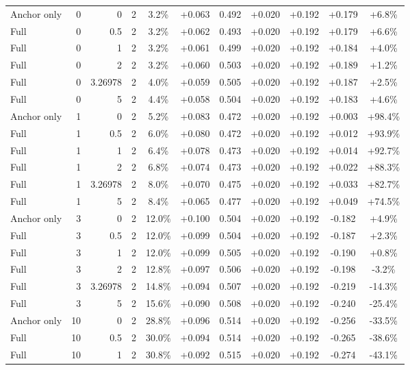 \begin{table}[htbp]
\begin{tabular}{lrrrccccccc}
Anchor only & 0 & 0 & 2 & 3.2\% & +0.063 & 0.492 & +0.020 & +0.192 & +0.179 & +6.8\% \\
Full & 0 & 0.5 & 2 & 3.2\% & +0.062 & 0.493 & +0.020 & +0.192 & +0.179 & +6.6\% \\
Full & 0 & 1 & 2 & 3.2\% & +0.061 & 0.499 & +0.020 & +0.192 & +0.184 & +4.0\% \\
Full & 0 & 2 & 2 & 3.2\% & +0.060 & 0.503 & +0.020 & +0.192 & +0.189 & +1.2\% \\
Full & 0 & 3.26978 & 2 & 4.0\% & +0.059 & 0.505 & +0.020 & +0.192 & +0.187 & +2.5\% \\
Full & 0 & 5 & 2 & 4.4\% & +0.058 & 0.504 & +0.020 & +0.192 & +0.183 & +4.6\% \\
Anchor only & 1 & 0 & 2 & 5.2\% & +0.083 & 0.472 & +0.020 & +0.192 & +0.003 & +98.4\% \\
Full & 1 & 0.5 & 2 & 6.0\% & +0.080 & 0.472 & +0.020 & +0.192 & +0.012 & +93.9\% \\
Full & 1 & 1 & 2 & 6.4\% & +0.078 & 0.473 & +0.020 & +0.192 & +0.014 & +92.7\% \\
Full & 1 & 2 & 2 & 6.8\% & +0.074 & 0.473 & +0.020 & +0.192 & +0.022 & +88.3\% \\
Full & 1 & 3.26978 & 2 & 8.0\% & +0.070 & 0.475 & +0.020 & +0.192 & +0.033 & +82.7\% \\
Full & 1 & 5 & 2 & 8.4\% & +0.065 & 0.477 & +0.020 & +0.192 & +0.049 & +74.5\% \\
Anchor only & 3 & 0 & 2 & 12.0\% & +0.100 & 0.504 & +0.020 & +0.192 & -0.182 & +4.9\% \\
Full & 3 & 0.5 & 2 & 12.0\% & +0.099 & 0.504 & +0.020 & +0.192 & -0.187 & +2.3\% \\
Full & 3 & 1 & 2 & 12.0\% & +0.099 & 0.505 & +0.020 & +0.192 & -0.190 & +0.8\% \\
Full & 3 & 2 & 2 & 12.8\% & +0.097 & 0.506 & +0.020 & +0.192 & -0.198 & -3.2\% \\
Full & 3 & 3.26978 & 2 & 14.8\% & +0.094 & 0.507 & +0.020 & +0.192 & -0.219 & -14.3\% \\
Full & 3 & 5 & 2 & 15.6\% & +0.090 & 0.508 & +0.020 & +0.192 & -0.240 & -25.4\% \\
Anchor only & 10 & 0 & 2 & 28.8\% & +0.096 & 0.514 & +0.020 & +0.192 & -0.256 & -33.5\% \\
Full & 10 & 0.5 & 2 & 30.0\% & +0.094 & 0.514 & +0.020 & +0.192 & -0.265 & -38.6\% \\
Full & 10 & 1 & 2 & 30.8\% & +0.092 & 0.515 & +0.020 & +0.192 & -0.274 & -43.1\% \\

\end{tabular}
\end{table}
